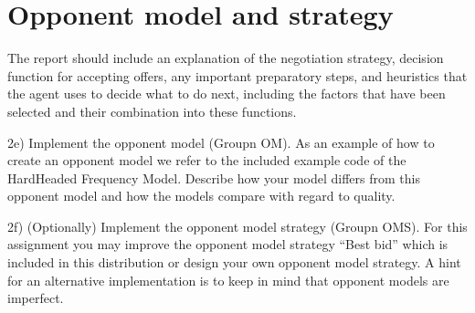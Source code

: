 \section{Opponent model and strategy}

The report should include an explanation of the negotiation strategy, decision function for accepting offers, any important preparatory steps, and heuristics that the agent uses to decide what to do next, including the factors that have been selected and their combination into these functions.

2e) Implement the opponent model (Groupn OM). As an example of how to create an opponent
model we refer to the included example code of the HardHeaded Frequency Model. Describe
how your model differs from this opponent model and how the models compare with regard to
quality.

2f) (Optionally) Implement the opponent model strategy (Groupn OMS). For this assignment
you may improve the opponent model strategy “Best bid” which is included in this distribution
or design your own opponent model strategy. A hint for an alternative implementation is to
keep in mind that opponent models are imperfect.